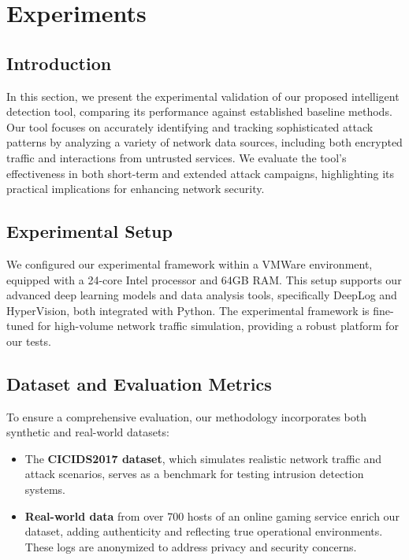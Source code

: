 \section{Experiments}\label{sec:exps}
\subsection{Introduction}\label{sec:intro-experiments}
In this section, we present the experimental validation of our proposed intelligent detection tool, comparing its performance against established baseline methods. Our tool focuses on accurately identifying and tracking sophisticated attack patterns by analyzing a variety of network data sources, including both encrypted traffic and interactions from untrusted services. We evaluate the tool's effectiveness in both short-term and extended attack campaigns, highlighting its practical implications for enhancing network security.

\subsection{Experimental Setup}\label{sec:experimental-setup}
We configured our experimental framework within a VMWare environment, equipped with a 24-core Intel processor and 64GB RAM. This setup supports our advanced deep learning models and data analysis tools, specifically DeepLog and HyperVision, both integrated with Python. The experimental framework is fine-tuned for high-volume network traffic simulation, providing a robust platform for our tests.

\subsection{Dataset and Evaluation Metrics}\label{sec:env}
To ensure a comprehensive evaluation, our methodology incorporates both synthetic and real-world datasets:
\begin{itemize}
    \item The \textbf{CICIDS2017 dataset}, which simulates realistic network traffic and attack scenarios, serves as a benchmark for testing intrusion detection systems.
    \item \textbf{Real-world data} from over 700 hosts of an online gaming service enrich our dataset, adding authenticity and reflecting true operational environments. These logs are anonymized to address privacy and security concerns.
\end{itemize}

